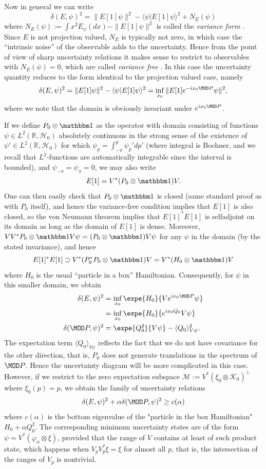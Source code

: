 Now in general we can write 
$$
\delta(E,\psi)^2 = \|E[1]\psi\|^2 - \langle \psi| E[1]\psi\rangle^2 + N_E(\psi)
$$
where $N_E(\psi) := \int x^2 E_\psi(dx) -\|E[1]\psi\|^2$ is called the \emph{variance form} \cite{werner}. Since $E$ is not projection valued, $N_E$ is typically not zero, in which case the ``intrinsic noise'' of the observable adds to the uncertainty. Hence from the point of view of sharp uncertainty relations it makes sense to restrict to observables with $N_E(\psi)=0$, which are called \emph{variance free} \cite{}. In this case the uncertainty quantity reduces to the form identical to the projection valued case, namely
$$
\delta(E,\psi)^2 = \|E[1]\psi\|^2 - \langle \psi| E[1]\psi\rangle^2 = \inf_{x_0} \| E[1]e^{-ix_0\MOD P}\psi\|^2,
$$
where we note that the domain is obviously invariant under $e^{ix_0\MOD P}$.

If we define $P_0\otimes \id$ as the operator with domain consisting of functions $\psi\in L^2(\mathbb R,\mathcal H_0)$ absolutely continuous in the strong sense of the existence of $\psi'\in L^2(\mathbb R,\mathcal H_0)$ for which $\psi_p = \int_{-\pi}^p \psi_p'dp'$ (where integral is Bochner, and we recall that $L^2$-functions are automatically integrable since the interval is bounded), and $\psi_{-\pi}=\psi_\pi=0$, we may also write
$$
E[1] = V^* (P_0\otimes \id) V.
$$
One can then easily check that $P_0\otimes \id$ is closed (same standard proof as with $P_0$ itself), and hence the variance-free condition implies that $E[1]$ is also closed, so the von Neumann theorem implies that $E[1]^*E[1]$ is selfadjoint on its domain as long as the domain of $E[1]$ is dense. Moreover, $VV^*P_0\otimes \id V\psi=(P_0\otimes \id) V\psi$ for any $\psi$ in the domain (by the stated invariance), and hence 
$$
E[1]^*E[1]\supset V^*(P_0^*P_0\otimes \id)V = V^*(H_0\otimes \id)V
$$
where $H_0$ is the usual ``particle in a box'' Hamiltonian. Consequently, for $\psi$ in this smaller domain, we obtain
\begin{align*}
  \delta(E,\psi)^2 &= \inf_{x_0} \expe{H_0}{Ve^{i x_0\MOD P}\psi}\\
                   &= \inf_{x_0} \expe{H_0}{e^{i x_0 Q_0}V\psi}\\
  \delta(\MOD P,\psi)^2 &= \expe{Q_0^2}{V\psi} -\langle Q_0\rangle_{V\psi}^2.
\end{align*}
The expectation term $\langle Q_0\rangle_{V\psi}$ reflects the fact that we do not have covariance for the other direction, that is, $P_0$ does not generate translations in the spectrum of $\MOD P$. Hence the uncertainty diagram will be more complicated in this case. However, if we restrict to the zero expectation subspace $\mathcal M := V^*(\xi_0\otimes \mathcal K_0)^\perp$ where
$\xi_0(p) =p$, we obtain the family of uncertainty relations
$$
\delta(E,\psi)^2+\alpha\delta(\MOD P,\psi)^2\geq c(\alpha)
$$
where $c(\alpha)$ is the bottom eigenvalue of the "particle in the box Hamiltonian" $H_0+\alpha Q_0^2$. The corresponding minimum uncertainty states are of the form $\psi = V^*(\varphi_\alpha\otimes\xi)$, provided that the range of $V$ contains at least of such product state, which happens when $V_pV_p^*\xi =\xi$ for almost all $p$, that is, the intersection of the ranges of $V_p$ is nontrivial.

